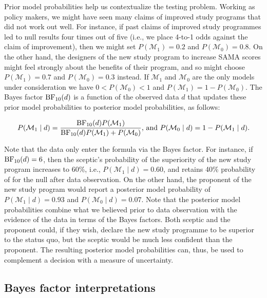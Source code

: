 \documentclass[english,,doc,floatsintext]{apa6}
\begin{document}
Prior model probabilities help us contextualize the testing problem. Working as policy makers, we might have seen many claims of improved study programs that did not work out well. For instance, if past claims of improved study programmes led to null results four times out of five (i.e., we place 4-to-1 odds against the claim of improvement), then we might set \(P( \mathcal{M}_{1}) = 0.2\) and \(P(\mathcal{M}_{0}) = 0.8\). On the other hand, the designers of the new study program to increase SAMA scores might feel strongly about the benefits of their program, and so might choose \(P( \mathcal{M}_{1}) = 0.7\) and \(P(\mathcal{M}_{0}) = 0.3\) instead. If \(\mathcal{M}_{1}\) and \(\mathcal{M}_{0}\) are the only models under consideration we have \(0 < P( \mathcal{M}_{0}) < 1\) and \(P( \mathcal{M}_{1})= 1 - P( \mathcal{M}_{0})\). The Bayes factor \(\textnormal{BF}_{10}(d)\) is a function of the observed data \(d\) that updates these prior model probabilities to posterior model probabilities, as follows:

\begin{equation}
\label{eqPriorToPosterior}
P(\mathcal{M}_{1} \mid d) = \frac{ \textnormal{BF}_{10}(d) P(\mathcal{M}_{1})}{\textnormal{BF}_{10}(d) P(\mathcal{M}_{1}) + P(\mathcal{M}_{0})} \text{, and } P(\mathcal{M}_{0} \mid d) = 1 - P(\mathcal{M}_{1} \mid d). 
\end{equation}

Note that the data only enter the formula via the Bayes factor. For instance, if \(\textnormal{BF}_{10}(d) = 6\), then the sceptic's probability of the superiority of the new study program increases to 60\%, i.e., \(P(\mathcal{M}_{1} \mid d)=0.60\), and retains 40\% probability of for the null after data observation. On the other hand, the proponent of the new study program would report a posterior model probability of \(P(\mathcal{M}_{1} \mid d)=0.93\) and \(P(\mathcal{M}_{0} \mid d)=0.07\). Note that the posterior model probabilities combine what we believed prior to data observation with the evidence of the data in terms of the Bayes factors. Both sceptic and the proponent could, if they wish, declare the new study programme to be superior to the status quo, but the sceptic would be much less confident than the proponent. The resulting posterior model probabilities can, thus, be used to complement a decision with a measure of uncertainty.

\hypertarget{bayes-factor-interpretations}{%
\subsection{Bayes factor interpretations}\label{bayes-factor-interpretations}}
\end{document}
